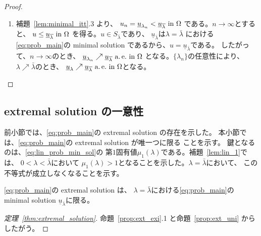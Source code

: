 \begin{proof}
\begin{enumerate}[1.]
\begin{equation}
         \int_\Omega (Du \cdot D\psi + a u \psi) dx 
          = \int_\Omega bu^p \psi dx + \bar{\lambda} \int_\Omega f\psi dx.
          \label{eq:minimal_u_weaksol}
        \end{equation}
        $\psi \in H_0^1(\Omega)$は任意であるから、
        $u \in H_0^1(\Omega)$は\ref{eq:prob_main}の extremal solution
        である。
        すなわち、\ref{eq:prob_main}の extremal solution
        が存在する。補題~\ref{lem:minimal_itt}.2 より、
        特に$\lambda = \bar{\lambda}$における
        \ref{eq:prob_main}の minimal solution 
        $\underline{u}_{\bar{\lambda}}$
        が存在する。
  \item 補題~\ref{lem:minimal_itt}.3 より、
        $u_n = \underline{u}_{\lambda_n} <
        \underline{u}_{\overline{\lambda}} ~\text{in}~ \Omega$
        である。$n \to \infty$とすると、
        $u \leq \underline{u}_{\overline{\lambda}} ~\text{in}~ \Omega$
        を得る。$u \in S_{\bar{\lambda}}$であり、
        $\underline{u}_{\bar{\lambda}}$は$\lambda = \bar{\lambda}$
        における \ref{eq:prob_main}の minimal solution 
        であるから、$u = \underline{u}_{\bar{\lambda}}$である。
        したがって、$n \to \infty$のとき、
        $\underline{u}_{\lambda_n} \nearrow
        \underline{u}_{\overline{\lambda}} ~\text{a.\,e.}~ \text{in}~ \Omega$
        となる。$\{ \lambda_n \}$の任意性により、
        $\lambda \nearrow \bar{\lambda}$のとき、
        $\underline{u}_{\lambda} \nearrow
        \underline{u}_{\overline{\lambda}} ~\text{a.\,e.}~ \text{in}~ \Omega$となる。\qedhere
 \end{enumerate}
\end{proof}

\subsection{extremal solution の一意性}

前小節では、\ref{eq:prob_main}の extremal solution の存在を示した。
本小節では、\ref{eq:prob_main}の extremal solution が唯一つに限る
ことを示す。
鍵となるのは、\eqref{eq:lin_prob_min_sol}の
第$1$固有値$\mu_1(\lambda)$である。補題~\ref{lem:lin_1}では、
$0 < \lambda < \bar{\lambda}$において
$\mu_1(\lambda) > 1$となることを示した。$\lambda = \bar{\lambda}$において、
この不等式が成立しなくなることを示す。

\begin{prop} \label{prop:ext_uni}
 \ref{eq:prob_main}の extremal solution は、
 $\lambda = \bar{\lambda}$における\ref{eq:prob_main}の minimal
 solution $\underline{u}_{\bar{\lambda}}$に限る。
\end{prop}

\begin{proof}[定理~\ref{thm:extremal_solution}]
 命題~\ref{prop:ext_exi}.1 と命題~\ref{prop:ext_uni} からしたがう。\qedhere
\end{proof}